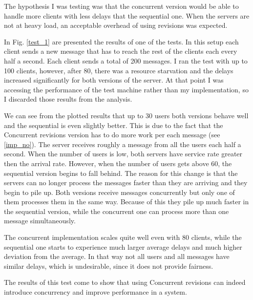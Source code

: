 \documentclass[12pt,twoside,notitlepage]{report}
\begin{document}
The hypothesis I was testing was that the concurrent version would be able to handle more clients with less delays that the sequential one. When the servers are not at heavy load, an acceptable overhead of using revisions was expected.

In Fig. \ref{test_1} are presented the results of one of the tests. In this setup each client sends a new message that has to reach the rest of the clients each every half a second. Each client sends a total of 200 messages. I ran the test with up to 100 clients, however, after 80, there was a resource starvation and the delays increased significantly for both versions of the server. At that point I was accessing the performance of the test machine rather than my implementation, so I discarded those results from the analysis.

We can see from the plotted results that up to 30 users both versions behave well and the sequential is even slightly better. This is due to the fact that the Concurrent revisions version has to do more work per each message (see \ref{imp_no}). The server receives roughly a message from all the users each half a second. When the number of users is low, both servers have service rate greater then the arrival rate. However, when the number of users gets above 60, the sequential version begins to fall behind. The reason for this change is that the servers can no longer process the messages faster than they are arriving and they begin to pile up. Both versions receive messages concurrently but only one of them processes them in the same way. Because of this they pile up much faster in the sequential version, while the concurrent one can process more than one message simultaneously. 

The concurrent implementation scales quite well even with 80 clients, while the sequential one starts to experience much larger average delays and much higher deviation from the average. In that way not all users and all messages have similar delays, which is undesirable, since it does not provide fairness.  

The results of this test come to show that using Concurrent revisions can indeed introduce concurrency and improve performance in a system. 
\end{document}
